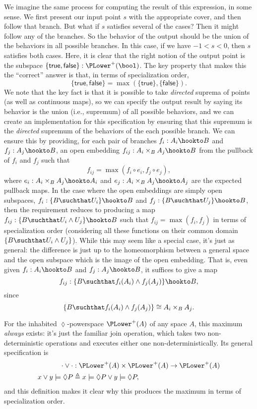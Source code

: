 We imagine the same process for computing the result of this expression, in some sense. We first present our input point $s$ with the appropriate cover, and then follow that branch. But what if $s$ satisfies several of the cases? Then it might follow any of the branches. So the behavior of the output should be the union of the behaviors in all possible branches. In this case, if we have $-1 < s < 0$, then $s$ satisfies both cases. Here, it is clear that the right notion of the output point is the subspace $\{ \mathsf{true}, \mathsf{false} \} : \PLower^+(\bool)$. The key property that makes this the ``correct'' answer is that, in terms of specialization order,
\[
\{ \mathsf{true}, \mathsf{false} \} = \max\left( \{ \mathsf{true} \} , \{ \mathsf{false} \} \right).
\]
We note that the key fact is that it is possible to take \emph{directed} suprema of points (as well as continuous maps), so we can specify the output result by saying its behavior is the union (i.e., supremum) of all possible behaviors, and we can create an implementation for this specification by ensuring that this supremum is the \emph{directed} supremum of the behaviors of the each possible branch. We can ensure this by providing, for each pair of branches $f_i : A_i \hookto B$ and $f_j : A_j \hookto B$, an open embedding $f_{ij} : A_i \times_B A_j \hookto B$ from the pullback of $f_i$ and $f_j$ such that
\[
f_{ij} = \max(f_i \circ e_i, f_j \circ e_j),
\]
where $e_i : A_i \times_B A_j \hookto A_i$ and $e_j : A_i \times_B A_j \hookto A_j$ are the expected pullback maps.
In the case where the open embeddings are simply open subspaces, $f_i : \{ B \suchthat U_i \} \hookto B$ and $f_j : \{ B \suchthat U_j \} \hookto B$, then the requirement reduces to producing a map $f_{ij} : \{ B \suchthat U_i \wedge U_j \} \hookto B$ such that $f_{ij} = \max(f_i, f_j)$ in terms of specialization order (considering all these functions on their common domain $ \{ B \suchthat U_i \wedge U_j \}$). While this may seem like a special case, it's just as general: the difference is just up to the homeomorphism between a general space and the open subspace which is the image of the open embedding. That is, even given $f_i : A_i \hookto B$ and $f_j : A_j \hookto B$, it suffices to give a map
\[
f_{ij} : \{B \suchthat f_i(A_i) \wedge f_j(A_j) \} \hookto B,
\]
since
\[
 \{B \suchthat f_i(A_i) \wedge f_j(A_j) \} \cong A_i \times_B A_j.
\]

For the inhabited $\lozenge$-powerspace $\PLower^+(A)$ of any space $A$, this maximum \emph{always} exists: it's just the familiar join operation, which takes two non-deterministic operations and executes either one non-deterministically. Its general specification is
\begin{align*}
\cdot \vee \cdot &: \PLower^+(A) \times \PLower^+(A) \to \PLower^+(A)
\\ x \vee y \models \lozenge P &\triangleq x \models \lozenge P \vee y \models \lozenge P,
\end{align*}
and this definition makes it clear why this produces the maximum in terms of specialization order.

